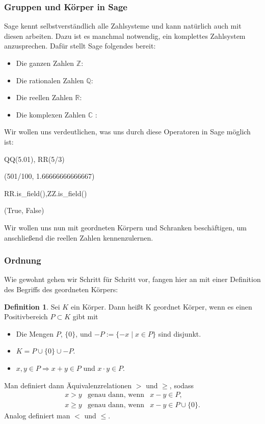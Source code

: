 \documentclass[fontsize=12pt,paper=a4,twoside,bibtotoc,idxtotoc,
liststotoc,pagesize,BCOR1.2cm,DIV15,chapterprefix,pagesize=pdftex]{scrbook}
\theoremstyle{plain}
\theoremstyle{definition}
\newtheorem{df}[equation]{Definition}
\theoremstyle{remark}
\begin{document}
\subsubsection{Gruppen und Körper in Sage}
Sage kennt selbstverständlich alle Zahlsysteme und kann natürlich auch mit diesen arbeiten. Dazu ist es manchmal notwendig, ein komplettes Zahlsystem
anzusprechen. Dafür stellt Sage folgendes bereit:
\begin{itemize}
\item Die ganzen Zahlen  $\mathbb{Z}$: 
\item Die rationalen Zahlen $\mathbb{Q}$:  
\item Die reellen Zahlen $\mathbb{R}$:  
\item Die komplexen Zahlen $\mathbb{C}$ : 
\end{itemize}
Wir wollen uns verdeutlichen, was uns durch diese Operatoren in Sage möglich ist:
\begin{sagein}
QQ(5.01), RR(5/3) 
\end{sagein}
\begin{sageout}
(501/100, 1.66666666666667)
\end{sageout}
\begin{sagein}
RR.is_field(),ZZ.is_field()
\end{sagein}
\begin{sageout}
(True, False)
\end{sageout}
Wir wollen uns nun mit geordneten Körpern und Schranken beschäftigen, um anschließend die reellen Zahlen kennenzulernen.
\subsubsection{Ordnung}
Wie gewohnt gehen wir Schritt für Schritt vor, fangen hier an mit einer Definition des Begriffs des geordneten Körpers:
\begin{df}
Sei $K$ ein Körper. Dann heißt K geordnet Körper, wenn es einen 
Positivbereich $P \subset K$ gibt mit
\begin{itemize}
 \item Die Mengen $P$, $\{ 0 \}$, und $-P:=\{-x\;|\;x \in P \}$ sind
disjunkt. 
 \item $K = P \cup \{ 0 \} \cup -P$.
 \item $x,y \in P\Rightarrow x+y \in P$ und $x \cdot y \in P$. 
\end{itemize}
\end{df}
Man definiert dann Äquivalenzrelationen $>$ und $\geq$, sodass
\begin{eqnarray*}
 x >y& \text{genau dann, wenn}& x-y\in P,\\
 x \geq y&  \text{genau dann, wenn} &x-y \in P \cup \{ 0 \}.
\end{eqnarray*}
Analog definiert man $<$ und $\leq$. 
\end{document}
